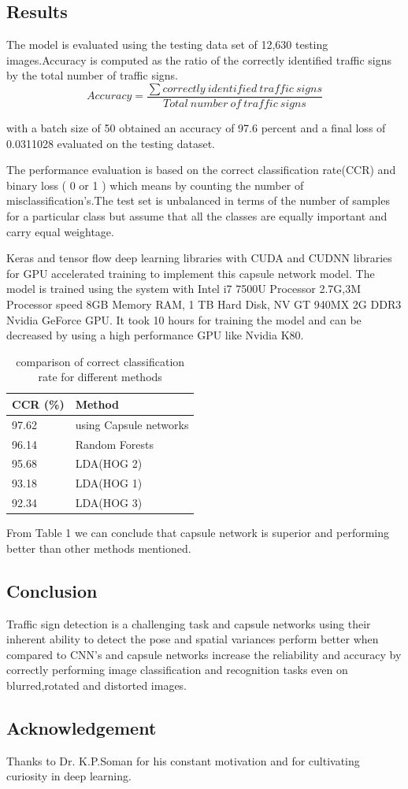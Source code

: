 \documentclass[letterpaper, 10 pt, conference]{ieeeconf}  %
\begin{document}
\subsection{Results}
The model is evaluated using the testing data set of 12,630 testing images.Accuracy is computed as the ratio of the correctly identified traffic signs by the total number of traffic signs.\cite{Park:2013:DVP:2444044.2444225}
$$
Accuracy=\frac{\sum correctly\ identified \ traffic \ signs}{Total \ number \ of \ traffic \ signs}
$$ \par
with a batch size of 50 obtained an accuracy of 97.6 percent and a final loss of 0.0311028 evaluated on the testing dataset. \par
The performance evaluation is based on the correct classification rate(CCR) and binary loss ( 0 or 1 ) which means by counting the number of misclassification's.The test set is unbalanced in terms of the number of samples for a particular class but assume that all the classes are equally important and carry equal weightage. \par
 Keras and tensor flow deep learning libraries with CUDA and CUDNN libraries for GPU accelerated training to implement this capsule network model. The model is trained using the system with Intel i7 7500U Processor 2.7G,3M Processor speed 8GB Memory RAM, 1 TB Hard Disk, NV GT 940MX 2G DDR3 Nvidia GeForce GPU. It took 10 hours for training the model and can be decreased by using a high performance GPU like Nvidia K80.

\begin{table}
\centering
\caption{comparison of correct classification rate for different methods}
\begin{tabular}{ll} 
\hline
CCR (\%) & Method                   \\ 
\hline
97.62    & using Capsule networks              \\
96.14    & Random Forests \cite{stallkamp2011german}\\
95.68    & LDA(HOG 2) \cite{Lowe:2004:DIF:993451.996342}\\
93.18    & LDA(HOG 1) \cite{Lowe:1999:ORL:850924.851523}\\
92.34    & LDA(HOG 3) \cite{Lowe:2004:DIF:993451.996342}\\
\hline
\end{tabular}
\end{table}
From Table 1 we can conclude that capsule network is superior and performing better than other methods mentioned.
 \subsection{Conclusion}
Traffic sign detection is a challenging task and capsule networks using their inherent ability to detect the pose and spatial variances perform better when compared to CNN's and capsule networks increase the reliability and accuracy by correctly performing image classification and recognition tasks even on blurred,rotated and distorted images.

\subsection{Acknowledgement}
Thanks to Dr. K.P.Soman for his constant motivation and for cultivating curiosity in deep learning.


\end{document}

